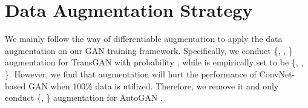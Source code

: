 \documentclass{article}
\begin{document}
\begin{table}[h]
\caption{Specific configuration of the discriminator of TransGAN-XL}
\label{table:TransGAN_D}
\centering
\begin{center}
\begin{small}
\end{small}
\end{center}
\end{table}







\section{Data Augmentation Strategy}
\label{sec:Appendix_E}
We mainly follow the way of differentiable augmentation \cite{zhao2020differentiable} to apply the data augmentation on our GAN training framework. Specifically, we conduct \{, , \} augmentation for TransGAN with probability , while  is empirically set to be \{, , \}. However, we find that  augmentation will hurt the performance of ConvNet-based GAN when 100\% data is utilized. Therefore, we remove it and only conduct \{, \} augmentation for AutoGAN \cite{gong2019autogan}.
\end{document}
